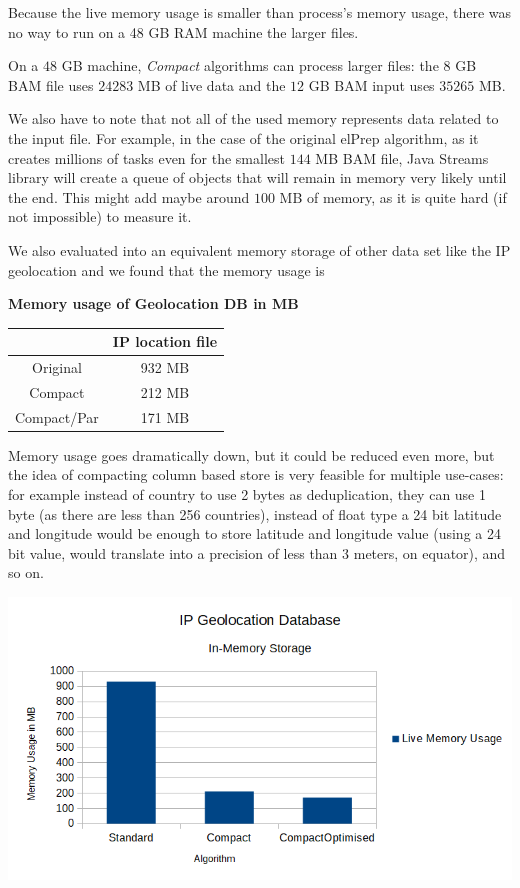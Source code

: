 \documentclass[a4paper,twoside]{article}
\begin{document}
Because the live memory usage is smaller than process's memory usage, there was no way to run on a 48 GB RAM machine the larger files.

On a $48$ GB machine, {\textit{Compact}} algorithms can process larger files: the $8$ GB BAM file uses $24283$ MB of live data and the $12$ GB BAM input uses $35 265$ MB.

We also have to note that not all of the used memory represents data related to the input file.
For example, in the case of the original elPrep algorithm, as it creates millions of tasks even for the smallest $144$ MB BAM file, Java Streams library will create a queue of objects that will remain in memory very likely until the end. This might add maybe around $100$ MB of memory, as it is quite hard (if not impossible) to measure it.

We also evaluated into an equivalent memory storage of other data set like the IP geolocation and we found that the memory usage is

\begin{small}
	\begin{center}
		\textbf{Memory usage of Geolocation DB in MB} \\
		\begin{tabular}{|c|c|}
			\hline			  	& IP location file		\\ \hline
			Original			& 932 MB			\\ \hline
			Compact 			& 212 MB			\\ \hline
			Compact/Par			& 171 MB			\\ \hline
		\end{tabular}
	\end{center}
\end{small}

Memory usage goes dramatically down, but it could be reduced even more, but the idea of compacting
column based store is very feasible for multiple use-cases: for example instead of country to use 2 bytes as deduplication, they can use 1 byte (as there are less than 256 countries), instead of float type a 24 bit latitude and longitude would be enough to store latitude and longitude value (using a 24 bit value, would translate into a precision of less than 3 meters, on equator), and so on.

\begin{center}
	\includegraphics[scale=0.5]{images/Geolocation_Chart.png}
\end{center}
\end{document}
